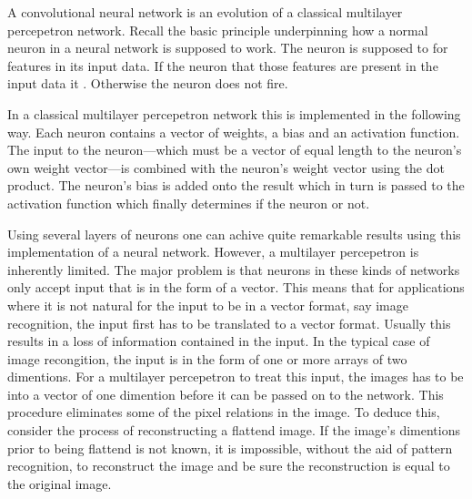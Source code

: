 \startsection[title={\em Convolutional} Neural Networks]
A convolutional neural network is an evolution of a classical multilayer percepetron network.
Recall the basic principle underpinning how a normal neuron in a neural network is supposed to work.
The neuron is supposed to  for features in its input data.
If the neuron  that those features are present in the input data it .
Otherwise the neuron does not fire.

In a classical multilayer percepetron network this is implemented in the following way.
Each neuron contains a vector of weights, a bias and an activation function.
The input to the neuron---which must be a vector of equal length to the neuron's own weight vector---is combined with the neuron's weight vector using the dot product.
The neuron's bias is added onto the result which in turn is passed to the activation function which finally determines if the neuron  or not.

Using several layers of neurons one can achive quite remarkable results using this implementation of a neural network.
However, a multilayer percepetron is inherently limited.
The major problem is that neurons in these kinds of networks only accept input that is in the form of a vector.
This means that for applications where it is not natural for the input to be in a vector format, say image recognition, the input first has to be translated to a vector format.
Usually this results in a loss of information contained in the input.
In the typical case of image recongition, the input is in the form of one or more arrays of two dimentions.
For a multilayer percepetron to treat this input, the images has to be  into a vector of one dimention before it can be passed on to the network.
This procedure eliminates some of the pixel relations in the image.
To deduce this, consider the process of reconstructing a flattend image.
If the image's dimentions prior to being flattend is not known, it is impossible, without the aid of pattern recognition, to reconstruct the image and be sure the reconstruction is equal to the original image.

